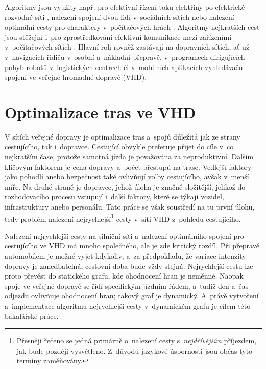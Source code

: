 Algoritmy jsou využity např. pro efektivní řízení toku elektřiny po elektrické rozvodné síti \cite{SunPowerGrid}, nalezení spojení dvou lidí v~sociálních sítích \cite{RezvanianSocNetworks} nebo nalezení optimální cesty pro charaktery v~počítačových hrách \cite{XiaoPCGames}. Algoritmy nejkratších cest jsou stěžejní i~pro zprostředkování efektivní komunikace mezi zařízeními v~počítačových sítích \cite{Schwartz1980}. Hlavní roli rovněž zastávají na dopravních sítích, ať už v~navigacích řidičů v~osobní a~nákladní přepravě, v~programech dirigujících pohyb robotů v~logistických centrech či v~mobilních aplikacích vyhledávačů spojení ve veřejné hromadné dopravě (VHD). 
 
\section*{Optimalizace tras ve VHD}
V sítích veřejné dopravy je optimalizace tras a~spojů důležitá jak ze strany cestujícího, tak i~dopravce. Cestující obvykle preferuje přijet do cíle v~co nejkratším čase, protože samotná jízda je považována za neproduktivní. Dalším klíčovým faktorem je cena dopravy a~počet přestupů na trase. Vedlejší faktory jako pohodlí anebo bezpečnost také ovlivňují volby cestujícího, avšak v~menší míře. Na druhé straně je dopravce, jehož úloha je značně složitější, jelikož do rozhodovacího procesu vstupují i~další faktory, které se týkají vozidel, infrastruktury anebo personálu. Tato práce se však soustředí na tu první úlohu, tedy problém nalezení nejrychlejší\footnote{Přesněji řečeno se jedná primárně o~nalezení cesty s~\emph{nejdřívějším} příjezdem, jak bude později vysvětleno. Z~důvodu jazykové úspornosti jsou občas tyto termíny zaměňovány.} cesty v~síti VHD z~pohledu cestujícího. 

Nalezení nejrychlejší cesty na silniční síti a~nalezení optimálního spojení pro cestujícího ve VHD má mnoho společného, ale je zde kritický rozdíl. Při přepravě automobilem je možné vyjet kdykoliv, a~za předpokladu, že variace intenzity dopravy je zanedbatelná, cestovní doba bude vždy stejná. Nejrychlejší cestu lze proto převést do statického grafu, kde ohodnocení hran je neměnné. Naopak spoje ve veřejné dopravě se řídí specifickým jízdním řádem, a~tudíž den a~čas odjezdu ovlivňuje ohodnocení hran; takový graf je dynamický. A~právě vytvoření a~implementace algoritmu nejrychlejší cesty v~dynamickém grafu je cílem této bakalářské práce.

